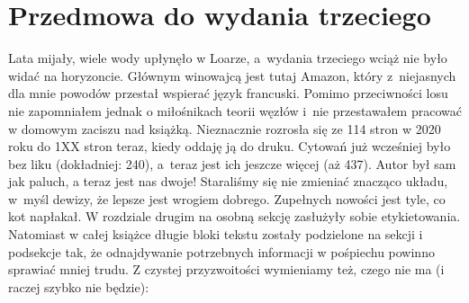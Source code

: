 \section*{Przedmowa do wydania trzeciego}
Lata mijały, wiele wody upłynęło w Loarze, a~wydania trzeciego wciąż nie było widać na horyzoncie.
Głównym winowajcą jest tutaj Amazon, który z~niejasnych dla mnie powodów przestał wspierać język francuski.
Pomimo przeciwności losu nie zapomniałem jednak o miłośnikach teorii węzłów i~nie przestawałem pracować w domowym zaciszu nad książką.
Nieznacznie rozrosła się ze 114 stron w 2020 roku do 1XX stron teraz, kiedy oddaję ją do druku.
Cytowań już wcześniej było bez liku (dokładniej: 240), a~teraz jest ich jeszcze więcej (aż 437).
Autor był sam jak paluch, a teraz jest nas dwoje!
Staraliśmy się nie zmieniać znacząco układu, w~myśl dewizy, że lepsze jest wrogiem dobrego.
Zupełnych nowości jest tyle, co kot napłakał.
W rozdziale drugim na osobną sekcję zasłużyły sobie etykietowania.
Natomiast w całej książce długie bloki tekstu zostały podzielone na sekcji i podsekcje tak, że odnajdywanie potrzebnych informacji w pośpiechu powinno sprawiać mniej trudu.
Z czystej przyzwoitości wymieniamy też, czego nie ma (i raczej szybko nie będzie):
